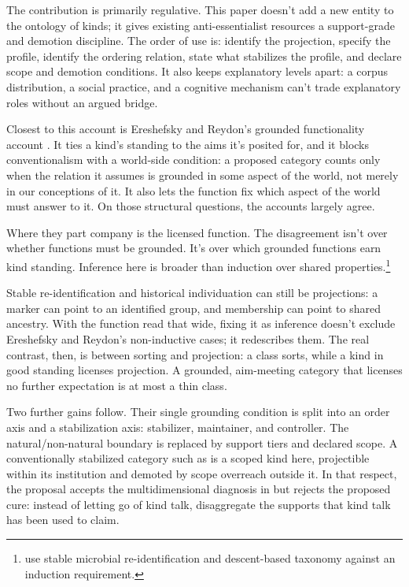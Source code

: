 \documentclass[12pt]{article}
\begin{document}
The contribution is primarily regulative. This paper doesn't add a new entity to
the ontology of kinds; it gives existing anti-essentialist resources a
support-grade and demotion discipline. The order of use is: identify the
projection, specify the profile, identify the ordering relation, state what
stabilizes the profile, and declare scope and demotion conditions. It also keeps
explanatory levels apart: a corpus distribution, a social practice, and a
cognitive mechanism can't trade explanatory roles without an argued bridge.

Closest to this account is Ereshefsky and Reydon's grounded functionality
account \citep{ereshefsky2023gfa}. It ties a kind's standing to the aims it's
posited for, and it blocks conventionalism with a world-side condition: a
proposed category counts only when the relation it assumes is grounded in some
aspect of the world, not merely in our conceptions of it. It also lets the
function fix which aspect of the world must answer to it. On those structural
questions, the accounts largely agree.

Where they part company is the licensed function. The disagreement isn't over
whether functions must be grounded. It's over which grounded functions earn kind
standing. Inference here is broader than induction over shared
properties.\footnote{\textcite{ereshefsky2023gfa} use stable microbial
re-identification and descent-based taxonomy against an induction requirement.}

Stable re-identification and historical individuation can still be projections:
a marker can point to an identified group, and membership can point to shared
ancestry. With the function read that wide, fixing it as inference doesn't
exclude Ereshefsky and Reydon's non-inductive cases; it redescribes them. The
real contrast, then, is between sorting and projection: a class sorts, while a
kind in good standing licenses projection. A grounded, aim-meeting category that
licenses no further expectation is at most a thin class.

Two further gains follow. Their single grounding condition is split into an
order axis and a stabilization axis: stabilizer, maintainer, and controller. The
natural/non-natural boundary is replaced by support tiers and declared scope. A
conventionally stabilized category such as  is
a scoped kind here, projectible within its institution and demoted by scope
overreach outside it. In that respect, the proposal accepts the
multidimensional diagnosis in \textcite{ludwig2018LettingGo,ludwig2024WithoutNaturalKinds}
but rejects the proposed cure: instead of letting go of kind talk, disaggregate
the supports that kind talk has been used to claim.
\end{document}

